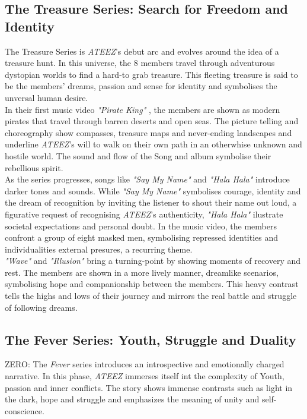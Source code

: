 \documentclass[a4paper,12pt]{article}
\begin{document}
\subsection{The Treasure Series: Search for Freedom and Identity}
The Treasure Series is \textit{ATEEZ}'s debut arc and evolves around the idea of a treasure hunt. In this universe, the 8 members travel through adventurous dystopian worlds to find a hard-to grab treasure. This fleeting treasure is said to be the members' dreams, passion and sense for identity and symbolises the unversal human desire.\\

In their first music video \textit{"Pirate King"} \cite{ateez_pirateking}, the members are shown as modern pirates that travel through barren deserts and open seas. The picture telling and choreography show compasses, treasure maps and never-ending landscapes and underline \textit{ATEEZ}'s will to walk on their own path in an otherwhise unknown and hostile world. The sound and flow of the Song and album symbolise their rebellious spirit.\\

As the series progresses, songs like \textit{"Say My Name"} and \textit{"Hala Hala"} \cite{ateez_halahala} introduce darker tones and sounds. While \textit{"Say My Name"} symbolises courage, identity and the dream of recognition by inviting the listener to shout their name out loud, a figurative request of recognising \textit{ATEEZ}'s authenticity, \textit{"Hala Hala"} ilustrate societal expectations and personal doubt. In the music video, the members confront a group of eight masked men, symbolising repressed identities and individualities external presures, a recurring theme.\\

\textit{"Wave"} \cite{ateez_wave} and \textit{"Illusion"} \cite{ateez_illusion} bring a turning-point by showing moments of recovery and rest. The members are shown in a more lively manner, dreamlike scenarios, symbolising hope and companionship between the members. This heavy contrast tells the highs and lows of their journey and mirrors the real battle and struggle of following dreams.\\

\subsection{The Fever Series: Youth, Struggle and Duality}
ZERO: The \textit{Fever} series introduces an introspective and emotionally charged narrative. In this phase, \textit{ATEEZ} immerses itself int the complexity of Youth, passion and inner conflicts. The story shows immense contrasts such as light in the dark, hope and struggle and emphasizes the meaning of unity and self-conscience.\\
\end{document}

